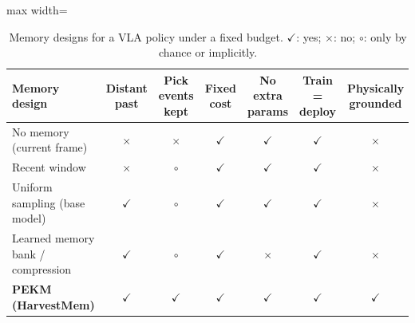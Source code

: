 \begin{table}[t]
\centering
\caption{Memory designs for a VLA policy under a fixed budget. $\checkmark$: yes; $\times$: no; $\circ$: only by chance or implicitly.}
\label{tab:positioning}
\footnotesize
\begin{adjustbox}{max width=\textwidth}\begin{tabular}{lcccccc}
\toprule
Memory design & Distant past & Pick events kept & Fixed cost & No extra params & Train = deploy & Physically grounded\\
\midrule
No memory (current frame) & $\times$ & $\times$ & $\checkmark$ & $\checkmark$ & $\checkmark$ & $\times$\\
Recent window & $\times$ & $\circ$ & $\checkmark$ & $\checkmark$ & $\checkmark$ & $\times$\\
Uniform sampling (base model) & $\checkmark$ & $\circ$ & $\checkmark$ & $\checkmark$ & $\checkmark$ & $\times$\\
Learned memory bank / compression & $\checkmark$ & $\circ$ & $\checkmark$ & $\times$ & $\checkmark$ & $\times$\\
\textbf{PEKM (HarvestMem)} & $\checkmark$ & $\checkmark$ & $\checkmark$ & $\checkmark$ & $\checkmark$ & $\checkmark$\\
\bottomrule
\end{tabular}\end{adjustbox}
\end{table}
